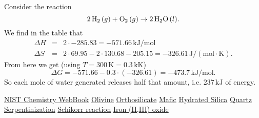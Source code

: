 \documentclass[a4paper,14pt]{extarticle}
\def\H{{\rm H}}
\def\O{{\rm O}}
\begin{document}
Consider the reaction
\[
    2 \,\H_2 \,(g) + \O_2 \,(g) \rightarrow 2 \,\H_2\O \,(l).
\]
We find in the table that
\[
    \begin{array}{rcl}
        \Delta H &=& 2 \cdot -285.83 = -571.66 \,\text{kJ}/\text{mol} \\
        \Delta S &=& 2 \cdot 69.95 - 2 \cdot 130.68 - 205.15 = -326.61 \,\text{J}/(\text{mol}\cdot \text{K}).
    \end{array}
\]
From here we get (using $T = 300 \,\text{K} = 0.3 \,\text{kK}$)
\[
    \Delta G = -571.66 - 0.3 \cdot (-326.61) = -473.7 \,\text{kJ}/\text{mol}.
\]
So each mole of water generated releases half that amount, i.e. $237 \,\text{kJ}$ of energy.

\begin{thebibliography}{9}
                  \href{https://webbook.nist.gov/}{NIST Chemistry WebBook}
               \href{https://en.wikipedia.org/wiki/Olivine}{Olivine}
         \href{https://en.wikipedia.org/wiki/Orthosilicate}{Orthosilicate}
                 \href{https://en.wikipedia.org/wiki/Mafic}{Mafic}
       \href{https://en.wikipedia.org/wiki/Hydrated_silica}{Hydrated Silica}
                \href{https://en.wikipedia.org/wiki/Quartz}{Quartz}
      \href{https://en.wikipedia.org/wiki/Serpentinization}{Serpentinization}
     \href{https://en.wikipedia.org/wiki/Schikorr_reaction}{Schikorr reaction}
     \href{https://en.wikipedia.org/wiki/Iron(II,III)_oxide}{Iron (II,III) oxide}
\end{thebibliography}
\end{document}
